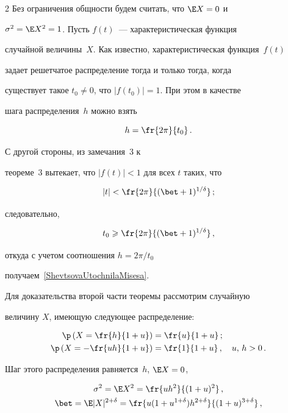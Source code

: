 \begin{multicols}{2}
Без ограничения общности будем считать, что ${\E X=0}$ и

${\sigma^2=\E X^2=1}$. Пусть $f(t)$~--- характеристическая функция

случайной величины~$X$. Как известно, характеристическая функция~$f(t)$

задает решетчатое распределение тогда и только тогда, когда

существует такое $t_0\neq0$, что $|f(t_0)|=1$. При этом в качестве

шага распределения~$h$ можно взять



\noindent

$$

h=\fr{2\pi}{t_0}\,.

$$

С другой стороны, из замечания~3 к

теореме~3 вытекает, что $|f(t)|<1$ для всех $t$ таких, что

$$

|t|<\fr{2\pi}{(\bet+1)^{1/\d}}\,;

$$

следовательно,

$$

t_0\ge \fr{2\pi}{(\bet+1)^{1/\d}}\,,

$$

откуда с учетом соотношения $h=2\pi/t_0$

получаем~\eqref{ShevtsovaUtochnilaMisesa}.



Для доказательства второй части теоремы рассмотрим случайную

величину $X$, имеющую следующее распределение:

\begin{align*}

\p\left(X=\fr{h}{1+u}\right)&=\fr{u}{1+u}\,;\\

\p\left(X=-\fr{uh}{1+u}\right)&=\fr{1}{1+u}\,,\quad u,\,h>0\,.

\end{align*}

Шаг этого распределения равняется~$h$, $\E X=0$,

\begin{gather*}

\sigma^2=\E X^2= \fr{u h^2}{(1+u)^2}\,,\\

\bet=\E|X|^{2+\d} =\fr{u(1+u^{1+\d})h^{2+\d}}{(1+u)^{3+\d}}\,,\\


\end{gather*}
\end{multicols}
